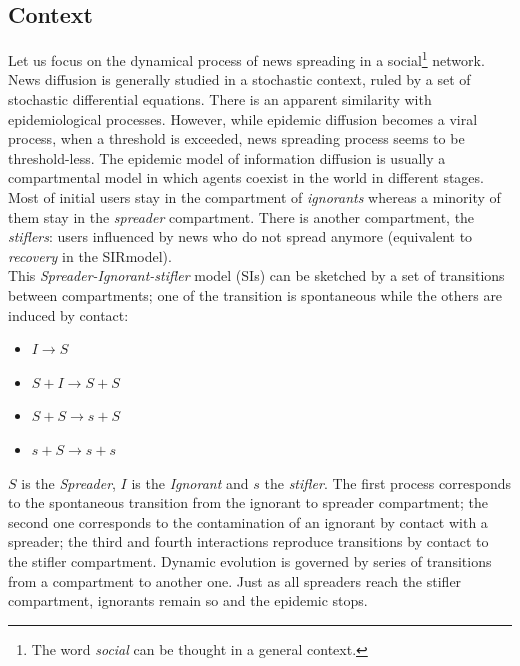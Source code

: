 \subsection{Context}
Let us focus on the dynamical process of news spreading in a social\footnote{The word \textit{social} can be thought in a general context.} network.\\
News diffusion is generally studied in a stochastic context, ruled by a
set of stochastic differential equations.\cite{chen2013information}
There is an apparent similarity with epidemiological processes. 
However, while epidemic diffusion becomes a viral process, when a
threshold is exceeded, news spreading process seems to be threshold-less.
The epidemic model of information diffusion is usually a compartmental model
in which agents coexist in the world in different
stages.\cite{barrat2008dynamical}
Most of initial users stay in the compartment of \textit{ignorants} whereas
a minority of them stay in the \textit{spreader} compartment.
There is another compartment, the \textit{stiflers}: users influenced by news
who do not spread anymore (equivalent to \textit{recovery} in the
SIR\footnotemark model).\\
This \textit{Spreader-Ignorant-stifler} model (SIs) can be sketched by a set
of transitions between compartments; one of the transition is spontaneous
while the others are induced by contact:
%
\begin{itemize}
\item$ I \longrightarrow S$
\item $S+I \longrightarrow S + S$

\item $S + S \longrightarrow s + S$

\item $s + S \longrightarrow  s + s$
\end{itemize}
%
$S$ is the \textit{Spreader}, $I$ is the \textit{Ignorant} and $s$
the \textit{stifler}. 
The first process corresponds to the spontaneous transition from the ignorant
to spreader compartment; the second one corresponds to
the contamination of an ignorant by contact with a spreader; 
the third and fourth interactions reproduce transitions by contact
to the stifler compartment. Dynamic evolution is governed by
series of transitions from a compartment to another one.
Just as all spreaders reach the stifler compartment, ignorants
remain so and the epidemic stops.\\
